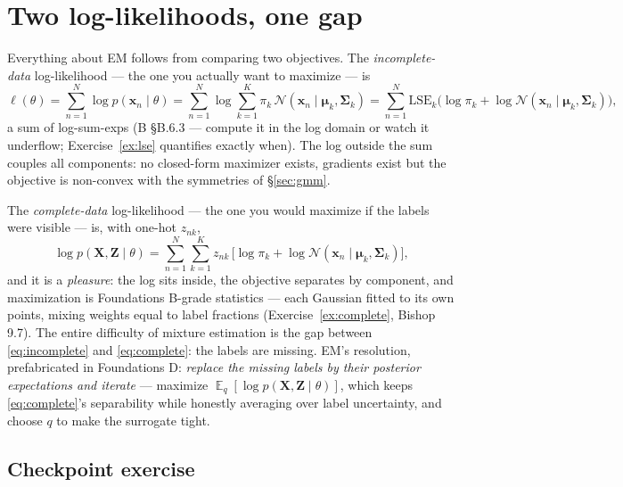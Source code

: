 \documentclass[11pt]{article}
\numberwithin{equation}{section}
\theoremstyle{plain}
\theoremstyle{definition}
\theoremstyle{remark}
\newcounter{exercise}
\DeclareMathOperator{\E}{\mathbb{E}}
\newcommand{\Normal}{\mathcal{N}}
\newcommand{\x}{\bm{x}}
\newcommand{\bmu}{\bm{\mu}}
\newcommand{\bSigma}{\bm{\Sigma}}
\begin{document}
\section{Two log-likelihoods, one gap}\label{sec:twolik}

Everything about EM follows from comparing two objectives. The \emph{incomplete-data} log-likelihood --- the one you actually want to maximize --- is
\begin{equation}
\ell(\theta) = \sum_{n=1}^N \log p(\x_n \mid \theta)
= \sum_{n=1}^N \log \sum_{k=1}^K \pi_k\, \Normal(\x_n \mid \bmu_k, \bSigma_k)
= \sum_{n=1}^N \mathrm{LSE}_k\big( \log \pi_k + \log \Normal(\x_n \mid \bmu_k, \bSigma_k) \big),
\label{eq:incomplete}
\end{equation}
a sum of log-sum-exps (B \S B.6.3 --- compute it in the log domain or watch it underflow; Exercise~\ref{ex:lse} quantifies exactly when). The log outside the sum couples all components: no closed-form maximizer exists, gradients exist but the objective is non-convex with the symmetries of \S\ref{sec:gmm}.

The \emph{complete-data} log-likelihood --- the one you would maximize if the labels were visible --- is, with one-hot $z_{nk}$,
\begin{equation}
\log p(\bm X, \bm Z \mid \theta)
= \sum_{n=1}^N \sum_{k=1}^K z_{nk}\, \big[ \log \pi_k + \log \Normal(\x_n \mid \bmu_k, \bSigma_k) \big],
\label{eq:complete}
\end{equation}
and it is a \emph{pleasure}: the log sits inside, the objective separates by component, and maximization is Foundations B-grade statistics --- each Gaussian fitted to its own points, mixing weights equal to label fractions (Exercise~\ref{ex:complete}, Bishop 9.7). The entire difficulty of mixture estimation is the gap between \eqref{eq:incomplete} and \eqref{eq:complete}: the labels are missing. EM's resolution, prefabricated in Foundations D: \emph{replace the missing labels by their posterior expectations and iterate} --- maximize $\E_q[\log p(\bm X, \bm Z \mid \theta)]$, which keeps \eqref{eq:complete}'s separability while honestly averaging over label uncertainty, and choose $q$ to make the surrogate tight.


\subsection*{Checkpoint exercise}
\end{document}

